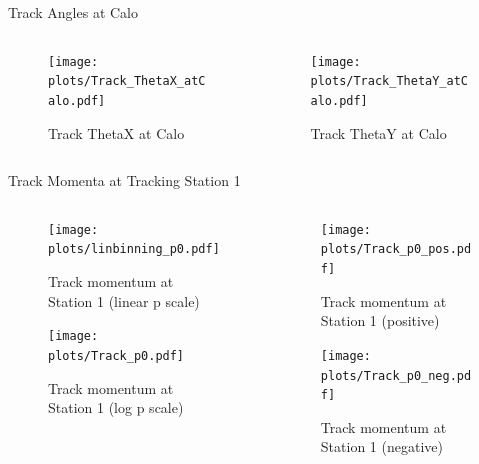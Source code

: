 \begin{subframe}{Track Angles at Calo}
	\begin{columns}
		\begin{column}{0.5\textwidth}
			\begin{figure}
				\texttt{[image: \\plots/Track\_ThetaX\_atCalo.pdf]}
				\caption{Track ThetaX at Calo}
			\end{figure}
		\end{column}
		\begin{column}{0.5\textwidth}
			\begin{figure}
				\texttt{[image: \\plots/Track\_ThetaY\_atCalo.pdf]}
				\caption{Track ThetaY at Calo}
			\end{figure}
		\end{column}
	\end{columns}
\end{subframe}

\begin{frame}{Track Momenta at Tracking Station 1}
	\begin{columns}
		\begin{column}{0.5\textwidth}
			\vspace{-0.4cm}
			\begin{figure}
				\texttt{[image: \\plots/linbinning\_p0.pdf]}
				\caption{Track momentum at Station 1 (linear p scale)}
			\end{figure}
			\vspace{-0.9cm}
			\begin{figure}
				\texttt{[image: \\plots/Track\_p0.pdf]}
				\caption{Track momentum at Station 1 (log p scale)}
			\end{figure}
		\end{column}
		\begin{column}{0.5\textwidth}
			\vspace{-0.4cm}
			\begin{figure}
				\texttt{[image: \\plots/Track\_p0\_pos.pdf]}
				\caption{Track momentum at Station 1 (positive)}
			\end{figure}
			\vspace{-0.9cm}
			\begin{figure}
				\texttt{[image: \\plots/Track\_p0\_neg.pdf]}
				\caption{Track momentum at Station 1 (negative)}
			\end{figure}
		\end{column}
	\end{columns}
	

\end{frame}

